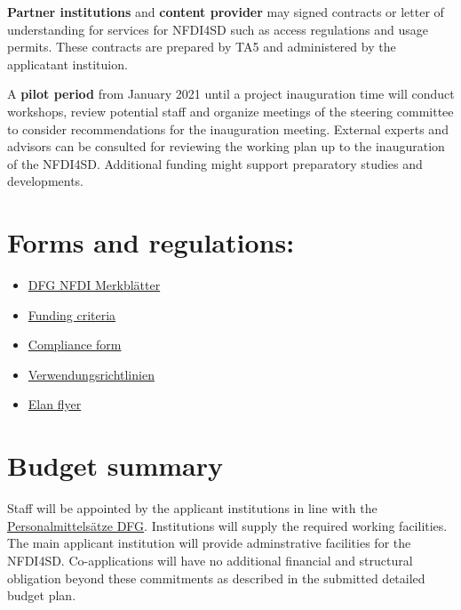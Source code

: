 \documentclass[
  english,
  paper=a4,
  oneside,captions=tableheading
]{scrbook}
\providecommand{\tightlist}{%
  \setlength{\itemsep}{0pt}\setlength{\parskip}{0pt}}
\begin{document}
\textbf{Partner institutions} and \textbf{content provider} may signed
contracts or letter of understanding for services for NFDI4SD such as
access regulations and usage permits. These contracts are prepared by
TA5 and administered by the applicatant instituion.

A \textbf{pilot period} from January 2021 until a project inauguration
time will conduct workshops, review potential staff and organize
meetings of the steering committee to consider recommendations for the
inauguration meeting. External experts and advisors can be consulted for
reviewing the working plan up to the inauguration of the NFDI4SD.
Additional funding might support preparatory studies and developments.

\hypertarget{forms-and-regulations}{%
\section{Forms and regulations:}\label{forms-and-regulations}}

\begin{itemize}
\tightlist
\item
  \href{https://www.dfg.de/foerderung/programme/nfdi/formulare_merkblaetter/index.jsp}{DFG
  NFDI Merkblätter}
\item
  \href{https://www.dfg.de/formulare/nfdi120/nfdi120_en.pdf}{Funding
  criteria}
\item
  \href{https://www.dfg.de/formulare/nfdi130/nfdi130_en.pdf}{Compliance
  form}
\item
  \href{https://www.dfg.de/formulare/nfdi300/nfdi300_de.pdf}{Verwendungsrichtlinien}
\item
  \href{https://www.dfg.de/download/pdf/foerderung/antragstellung/elan/flyer_eant_de.pdf}{Elan
  flyer}
\end{itemize}

\hypertarget{budget-summary}{%
\section{Budget summary}\label{budget-summary}}

Staff will be appointed by the applicant institutions in line with the
\href{https://www.dfg.de/formulare/60_12/60_12_de.pdf}{Personalmittelsätze
DFG}. Institutions will supply the required working facilities. The main
applicant institution will provide adminstrative facilities for the
NFDI4SD. Co-applications will have no additional financial and
structural obligation beyond these commitments as described in the
submitted detailed budget plan.
\end{document}
